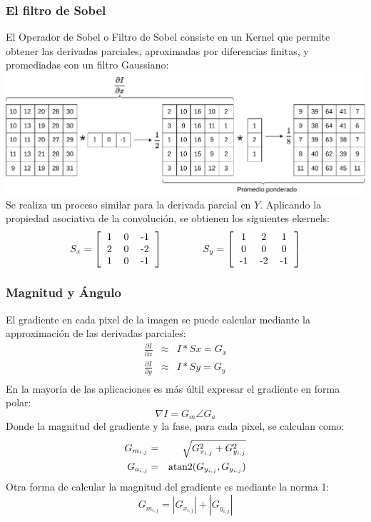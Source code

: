 \begin{frame}\frametitle{El filtro de Sobel}
  El Operador de Sobel o Filtro de Sobel consiste en un Kernel que permite obtener las derivadas parciales, aproximadas por diferencias finitas, y promediadas con un filtro Gaussiano:
  \includegraphics[width=\textwidth]{Figuras/SobelX1.pdf}
  Se realiza un proceso similar para la derivada parcial en $Y$. Aplicando la propiedad asociativa de la convolución, se obtienen los siguientes ekernels:
  \[S_x = \left[\begin{tabular}{ccc}1 & 0 & -1\\2 & 0 & -2\\1 & 0 & -1 \end{tabular}\right]\qquad\qquad
  S_y = \left[\begin{tabular}{ccc}1 & 2 & 1\\0 & 0 & 0\\-1 & -2 & -1 \end{tabular}\right]\]
\end{frame}

\begin{frame}\frametitle{Magnitud y Ángulo}
  El gradiente en cada pixel de la imagen se puede calcular mediante la approximación de las derivadas parciales:
  \begin{eqnarray*}
    \frac{\partial I}{\partial x} &\approx& I * Sx = G_x\\
    \frac{\partial I}{\partial y} &\approx& I * Sy = G_y\\
  \end{eqnarray*}
  En la mayoría de las aplicaciones es más últil expresar el gradiente en forma polar:
  \[ \nabla I = G_m \angle G_a \]
  Donde la magnitud del gradiente y la fase, para cada pixel, se calculan como:
  \begin{eqnarray*}
    G_{m_{i,j}} &=& \sqrt{G_{x_{i,j}}^2 + G_{y_{i,j}}^2}\\
    G_{a_{i,j}} &=& \operatorname{atan2}(G_{y_{i,j}}, G_{y_{i,j}})\\
  \end{eqnarray*}
  Otra forma de calcular la magnitud del gradiente es mediante la norma 1:
  \[G_{m_{i,j}} = \left|G_{x_{i,j}}\right| + \left|G_{y_{i,j}}\right|\]
\end{frame}

